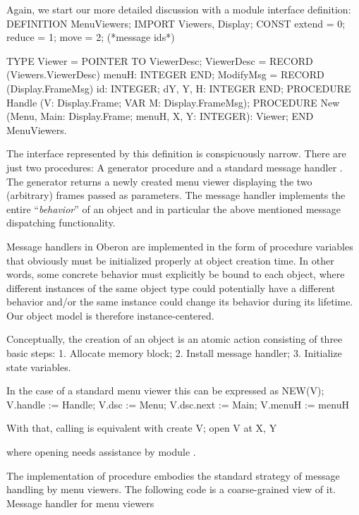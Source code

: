 Again, we start our more detailed discussion with a module interface definition:
\begintt
DEFINITION MenuViewers;
  IMPORT Viewers, Display;
  CONST extend = 0; reduce = 1; move = 2; (*message ids*)

  TYPE
    Viewer = POINTER TO ViewerDesc;
    ViewerDesc = RECORD (Viewers.ViewerDesc)
      menuH: INTEGER
    END;
    ModifyMsg = RECORD (Display.FrameMsg)
      id: INTEGER;
      dY, Y, H: INTEGER
    END;
  PROCEDURE Handle (V: Display.Frame; VAR M: Display.FrameMsg);
  PROCEDURE New (Menu, Main: Display.Frame;
                 menuH, X, Y: INTEGER): Viewer;
END MenuViewers.
\endtt

\noindent The interface represented by this definition is conspicuously
narrow. There are just two procedures: A generator procedure  and a
standard message handler . The generator returns a newly created
menu viewer displaying the two (arbitrary) frames passed as
parameters. The message handler implements the entire ``\emph{behavior}'' of an
object and in particular the above mentioned message dispatching
functionality.

Message handlers in Oberon are implemented in the form of procedure
variables that obviously must be initialized properly at object
creation time. In other words, some concrete behavior must explicitly
be bound to each object, where different instances of the same object
type could potentially have a different behavior and/or the same
instance could change its behavior during its lifetime. Our object
model is therefore instance-centered.

Conceptually, the creation of an object is an atomic action consisting
of three basic steps: 1. Allocate memory block; 2. Install message handler; 3. Initialize state variables.

In the case of a standard menu viewer  this can be expressed as
\begintt
NEW(V);
V.handle := Handle;
V.dsc := Menu;
V.dsc.next := Main;
V.menuH := menuH
\endtt

\noindent With that, calling  is equivalent with
\begintt
create V; open V at X, Y
\endtt

\noindent where opening  needs assistance by module .

The implementation of procedure  embodies the standard strategy of message handling by
menu viewers. The following code is a coarse-grained view of it.
\begintt
Message handler for menu viewers


